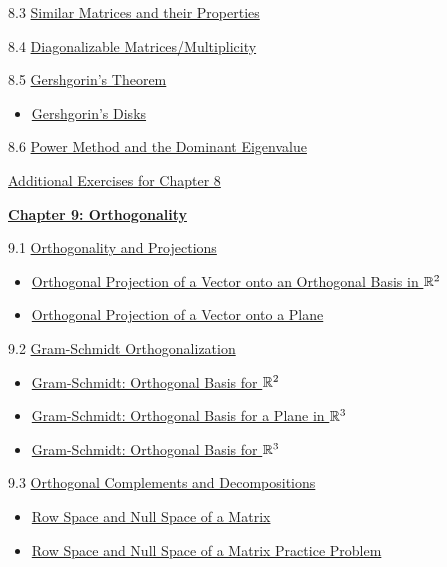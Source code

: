 \documentclass{ximera}
\begin{document}
8.3	\href{https://ximera.osu.edu/linearalgebradzv3/LinearAlgebraInteractiveIntro/EIG-0040/main}{Similar Matrices and their Properties}
	
8.4	\href{https://ximera.osu.edu/linearalgebradzv3/LinearAlgebraInteractiveIntro/EIG-0050/main}{Diagonalizable Matrices/Multiplicity}
	
8.5	\href{https://ximera.osu.edu/linearalgebradzv3/LinearAlgebraInteractiveIntro/EIG-0080/main}{Gershgorin's Theorem}
\begin{itemize}
    \item 
    \href{https://www.geogebra.org/m/jrpqazq4}{Gershgorin's Disks}
\end{itemize}
	
8.6	\href{https://ximera.osu.edu/linearalgebradzv3/LinearAlgebraInteractiveIntro/EIG-0070/main}{Power Method and the Dominant Eigenvalue}
	
\href{https://ximera.osu.edu/linearalgebradzv3/LinearAlgebraInteractiveIntro/SUPX-0080/main}{Additional Exercises for Chapter 8}
	
\href{https://ximera.osu.edu/linearalgebradzv3/LinearAlgebraInteractiveIntro/XLAChapter_orthogonality/main}{\textbf{Chapter 9: Orthogonality}}
	
9.1	\href{https://ximera.osu.edu/linearalgebradzv3/LinearAlgebraInteractiveIntro/RTH-0010/main}{Orthogonality and Projections}
\begin{itemize}
    \item 
    \href{https://www.geogebra.org/m/nsqzhsxv}{Orthogonal Projection of a Vector onto an Orthogonal Basis in $\mathbb{R}^2$}
   \item
   \href{https://www.geogebra.org/m/hehqyayz}{Orthogonal Projection of a Vector onto a Plane}
\end{itemize}
	
9.2	\href{https://ximera.osu.edu/linearalgebradzv3/LinearAlgebraInteractiveIntro/RTH-0015/main}{Gram-Schmidt Orthogonalization}
\begin{itemize}
    \item 
    \href{https://www.geogebra.org/m/xtqppyav}{Gram-Schmidt: Orthogonal Basis for $\mathbb{R}^2$}
    \item
    \href{https://www.geogebra.org/m/zghsfkym}{Gram-Schmidt: Orthogonal Basis for a Plane in $\mathbb{R}^3$}
    \item
    \href{https://www.geogebra.org/m/qjpvmsws}{Gram-Schmidt:  Orthogonal Basis for $\mathbb{R}^3$}
\end{itemize}
	
9.3	\href{https://ximera.osu.edu/linearalgebradzv3/LinearAlgebraInteractiveIntro/RTH-0020/main}{Orthogonal Complements and Decompositions}
\begin{itemize}
    \item 
    \href{https://www.geogebra.org/m/f6eavqxs}{Row Space and Null Space of a Matrix}
    \item
    \href{https://www.geogebra.org/m/tyntjmdp}{Row Space and Null Space of a Matrix Practice Problem}
\end{itemize}
	
\end{document}
